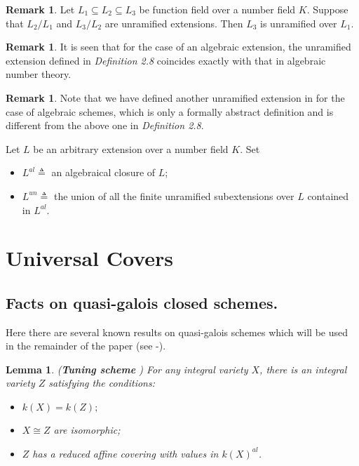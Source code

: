 \documentclass[12pt,twoside,reqno]{amsart}
\newtheorem{lemma}[theorem]{Lemma}
\theoremstyle{definition}
\newtheorem{remark}[theorem]{Remark}
\numberwithin{equation}{section}
\begin{document}
\begin{remark} Let $L_{1}\subseteq L_{2} \subseteq L_{3}$ be function field over a number field $K$. Suppose that $L_{2}/L_{1}$ and $L_{3}/L_{2}$ are unramified extensions. Then $L_{3}$ is unramified over $L_{1}$.
\end{remark}

\begin{remark}
It is seen that for the case of an algebraic extension, the unramified extension defined in \emph{Definition 2.8} coincides exactly  with that in algebraic number theory.
\end{remark}

\begin{remark}
Note that we have defined another unramified extension in \cite{An6} for the case of algebraic schemes, which is only a formally abstract definition and is different from the above one in \emph{Definition 2.8}.
\end{remark}

Let $L$ be an arbitrary extension over a number field $K$. Set

\begin{itemize}
\item $L^{al}\triangleq $ an algebraical closure of $L$;

\item $L^{un}\triangleq $ the union of all the finite unramified
subextensions over $L$ contained in $L^{al}$.
\end{itemize}


\section{Universal Covers}

\subsection{Facts on quasi-galois closed schemes.}

 Here there are several known results on quasi-galois schemes which will be used in the remainder of the paper  (see \cite{An2}-\cite{An7}).

\begin{lemma}\emph{(\textbf{Tuning scheme} \cite{An4*})}
For any integral variety $X$, there is an integral variety $Z$
satisfying the conditions:

\begin{itemize}
\item $k\left( X\right) =k\left( Z\right);$

\item $X\cong Z$ are isomorphic;

\item $Z$ has a reduced affine covering with values in $k(X)^{al}$.
\end{itemize}
\end{lemma}
\end{document}
